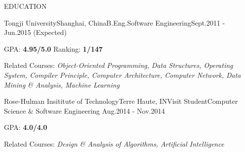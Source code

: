 \documentclass{resume} %
\begin{document}

\begin{rSection}{EDUCATION}

  \begin{eSubsection}{Tongji University}{Shanghai, China}{B.Eng.}{Software Engineering}{Sept.2011 - Jun.2015
    (Expected)}
  \item GPA: {\bf 4.95/5.0} \space\space Ranking: {\bf 1/147}
  \item Related Courses: {\em Object-Oriented Programming, Data Structures, Operating System, Compiler Principle,
    Computer Architecture, Computer Network, Data Mining \& Analysis, Machine Learning}
  \end{eSubsection}

  \begin{eSubsection}{Rose-Hulman Insititute of Technology}{Terre Haute, IN}{Visit Student}{Computer
    Science \& Software Engineering}{ Aug.2014 - Nov.2014}
  \item GPA: {\bf 4.0/4.0}
  \item Related Courses: {\em Design \& Analysis of Algorithms, Artificial Intelligence}
  \end{eSubsection}

\end{rSection}

\end{document}
